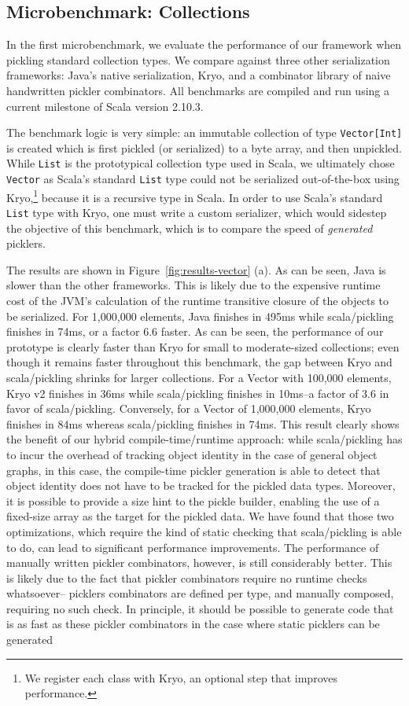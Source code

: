 \documentclass[10pt]{sigplanconf}
\theoremstyle{definition}
\theoremstyle{definition}
\begin{document}
\subsection{Microbenchmark: Collections}

In the first microbenchmark, we evaluate the performance of our
framework when pickling standard collection types. We compare against
three other serialization frameworks: Java's native serialization,
Kryo, and a combinator library of naive handwritten pickler combinators. All
benchmarks are compiled and run using a current milestone of Scala version 2.10.3.

The benchmark logic is very simple: an immutable collection of type
\verb|Vector[Int]| is created which is first pickled (or serialized)
to a byte array, and then unpickled. While \verb|List| is the prototypical collection type used in Scala, we ultimately chose \verb|Vector| as
Scala's standard \verb|List| type could not be serialized out-of-the-box using Kryo,\footnote{We register each class with Kryo, an optional step that improves performance.} because it is a recursive type in Scala. In order to use Scala's standard \verb|List| type with Kryo, one must write a custom serializer, which would sidestep the objective of this benchmark, which is to compare the speed of {\em generated} picklers.

The results are shown in Figure~\ref{fig:results-vector} (a). As can be seen,
Java is slower than the other frameworks. This is likely due to the expensive
runtime cost of the JVM's calculation of the runtime transitive closure of the
objects to be serialized. For 1,000,000 elements, Java finishes in 495ms while
scala/pickling finishes in 74ms, or a factor 6.6 faster. As can be seen, the
performance of our prototype is clearly faster than Kryo for small to
moderate-sized collections; even though it remains faster throughout this
benchmark, the gap between Kryo and scala/pickling shrinks for larger
collections. For a Vector with 100,000 elements, Kryo v2 finishes in 36ms
while scala/pickling finishes in 10ms--a factor of 3.6 in favor of
scala/pickling. Conversely, for a Vector of 1,000,000 elements, Kryo finishes
in 84ms whereas scala/pickling finishes in 74ms. This result clearly shows the
benefit of our hybrid compile-time/runtime approach: while scala/pickling has
to incur the overhead of tracking object identity in the case of general
object graphs, in this case, the compile-time pickler generation is able to
detect that object identity does not have to be tracked for the pickled data types.
Moreover, it is possible to provide a size hint to the pickle builder,
enabling the use of a fixed-size array as the target for the pickled data. We
have found that those two optimizations, which require the kind of static
checking that scala/pickling is able to do, can lead to significant
performance improvements. The performance of manually written pickler
combinators, however, is still considerably better. This is likely due to the
fact that pickler combinators require no runtime checks whatsoever-- picklers
combinators are defined per type, and manually composed, requiring no such
check. In principle, it should be possible to generate code that is as fast as
these pickler combinators in the case where static picklers can be generated
\end{document}
